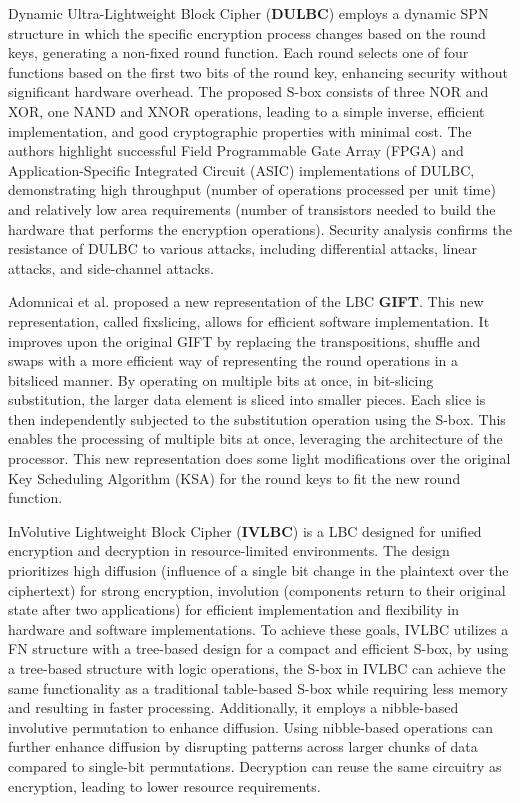 \documentclass[conference]{IEEEtran}
\begin{document}
Dynamic Ultra-Lightweight Block Cipher (\textbf{DULBC}) employs a dynamic SPN structure in which the specific encryption process changes based on the round keys, generating a non-fixed round function. Each round selects one of four functions based on the first two bits of the round key, enhancing security without significant hardware overhead. The proposed S-box consists of three NOR and XOR, one NAND and XNOR operations, leading to a simple inverse, efficient implementation, and good cryptographic properties with minimal cost. The authors highlight successful Field Programmable Gate Array (FPGA) and Application-Specific Integrated Circuit (ASIC) implementations of DULBC, demonstrating high throughput (number of operations processed per unit time) and relatively low area requirements (number of transistors needed to build the hardware that performs the encryption operations). Security analysis confirms the resistance of DULBC to various attacks, including differential attacks, linear attacks, and side-channel attacks\cite{DULBC}.


Adomnicai et al. proposed a new representation of the LBC \textbf{GIFT}. This new representation, called fixslicing, allows for efficient software implementation. It improves upon the original GIFT by replacing the transpositions, shuffle and swaps with a more efficient way of representing the round operations in a bitsliced manner. By operating on multiple bits at once, in bit-slicing substitution, the larger data element is sliced into smaller pieces. Each slice is then independently subjected to the substitution operation using the S-box. This enables the processing of multiple bits at once, leveraging the architecture of the processor. This new representation does some light modifications over the original Key Scheduling Algorithm (KSA) for the round keys to fit the new round function\cite{adomnicai2020fixslicing}.


InVolutive Lightweight Block Cipher (\textbf{IVLBC}) is a LBC designed for unified encryption and decryption in resource-limited environments. The design prioritizes high diffusion (influence of a single bit change in the plaintext over the ciphertext) for strong encryption, involution (components return to their original state after two applications) for efficient implementation and flexibility in hardware and software implementations. To achieve these goals, IVLBC utilizes a FN structure with a tree-based design for a compact and efficient S-box, by using a tree-based structure with logic operations, the S-box in IVLBC can achieve the same functionality as a traditional table-based S-box while requiring less memory and resulting in faster processing. Additionally, it employs a nibble-based involutive permutation to enhance diffusion. Using nibble-based operations can further enhance diffusion by disrupting patterns across larger chunks of data compared to single-bit permutations. Decryption can reuse the same circuitry as encryption, leading to lower resource requirements\cite{IVLBC}.
\end{document}
